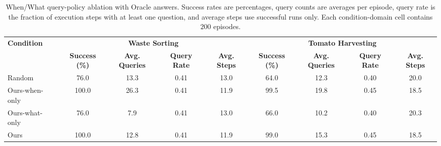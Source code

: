\begin{table}[t]
\centering
\caption{When/What query-policy ablation with Oracle answers. Success rates are percentages, query counts are averages per episode, query rate is the fraction of execution steps with at least one question, and average steps use successful runs only. Each condition-domain cell contains $200$ episodes.}
\label{tab:when_what_ablation}
\footnotesize
\setlength{\tabcolsep}{2pt}
\begin{tabular*}{\textwidth}{@{\extracolsep{\fill}}lcccccccc}
\toprule
\multirow{2}{*}{\textbf{Condition}} & \multicolumn{4}{c}{\textbf{Waste Sorting}} & \multicolumn{4}{c}{\textbf{Tomato Harvesting}} \\
\cmidrule(lr){2-5}\cmidrule(lr){6-9}
& \textbf{Success (\%)} & \textbf{Avg. Queries} & \textbf{Query Rate} & \textbf{Avg. Steps} & \textbf{Success (\%)} & \textbf{Avg. Queries} & \textbf{Query Rate} & \textbf{Avg. Steps} \\
\midrule
Random & 76.0 & 13.3 & 0.41 & 13.0 & 64.0 & 12.3 & 0.40 & 20.0 \\
Ours-when-only & 100.0 & 26.3 & 0.41 & 11.9 & 99.5 & 19.8 & 0.45 & 18.5 \\
Ours-what-only & 76.0 & 7.9 & 0.41 & 13.0 & 66.0 & 10.2 & 0.40 & 20.3 \\
Ours & 100.0 & 12.8 & 0.41 & 11.9 & 99.0 & 15.3 & 0.45 & 18.5 \\
\bottomrule
\end{tabular*}
\end{table}
